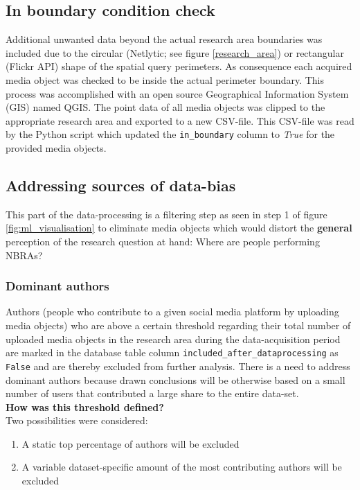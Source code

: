 \subsection{In boundary condition check} \label{in_boundary}
Additional unwanted data beyond the actual research area boundaries was included due to the circular (Netlytic; see figure \ref{research_area}) or rectangular (Flickr API) shape of the spatial query perimeters. As consequence each acquired media object was checked to be inside the actual perimeter boundary. This process was accomplished with an open source Geographical Information System (GIS) named QGIS. The point data of all media objects was clipped to the appropriate research area and exported to a new CSV-file. This CSV-file was read by the Python script which updated the \texttt{in\_boundary} column to \textit{True} for the provided media objects.

\subsection{Addressing sources of data-bias} \label{sources_data_bias}
This part of the data-processing is a filtering step as seen in step 1 of figure \ref{fig:ml_visualisation} to eliminate media objects which would distort the \textbf{general} perception of the research question at hand: Where are people performing NBRAs?

\subsubsection*{Dominant authors} \label{bias_dominant_authors}
Authors (people who contribute to a given social media platform by uploading media objects) who are above a certain threshold regarding their total number of uploaded media objects in the research area during the data-acquisition period are marked in the database table column \texttt{included\_after\_dataprocessing} as \texttt{False} and are thereby excluded from further analysis. There is a need to address dominant authors because drawn conclusions will be otherwise based on a small number of users that contributed a large share to the entire data-set.\\
\newline
\textbf{How was this threshold defined?}\\
\newline
Two possibilities were considered:
\begin{enumerate}
  \item A static top percentage of authors will be excluded
  \item A variable dataset-specific amount of the most contributing authors will be excluded
\end{enumerate}

